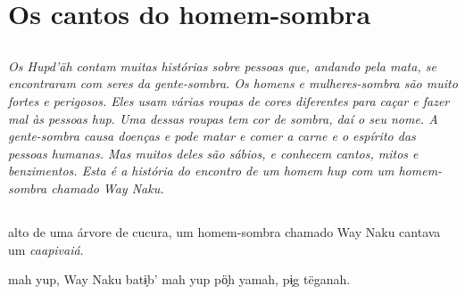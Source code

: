 \part{Os cantos do homem-sombra}

\chapter*{}
\thispagestyle{empty}

\vspace*{\fill}
\textit{Os Hupd'äh contam muitas histórias sobre pessoas que, andando pela mata, se
encontraram com seres da gente-sombra. Os homens e mulheres-sombra são muito fortes e perigosos. Eles usam várias roupas de cores diferentes para caçar e fazer mal às pessoas hup. Uma dessas roupas tem cor de sombra, daí o seu nome. A gente-sombra causa doenças e pode matar e comer a carne e o espírito das pessoas humanas. Mas muitos deles são sábios, e conhecem cantos, mitos e benzimentos. Esta é a história do encontro de um homem hup com um homem-sombra chamado Way Naku.}
\vspace*{\fill}

\openany

\chapter*{}
\mbox{}\vspace*{\fill}

\begingroup\raggedright\setlength{\linewidth}{.6\linewidth}


 alto de uma árvore de
cucura, um homem-sombra
chamado Way Naku cantava
um \textit{caapivaiá}.

\vspace{2em}

 mah yup, Way Naku
batɨ̗b’ mah yup pö̗h yamah,
pɨ̗g tëganah.

\vspace*{\fill}

